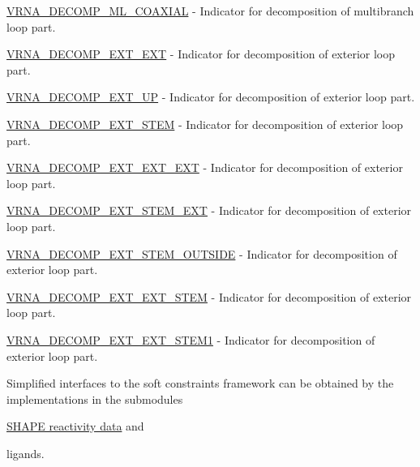 \begin{DoxyItemize}
\item \hyperlink{group__constraints_ga4fe48d575830b16c208e280e01ab1497}{V\+R\+N\+A\+\_\+\+D\+E\+C\+O\+M\+P\+\_\+\+M\+L\+\_\+\+C\+O\+A\+X\+I\+AL} -\/ Indicator for decomposition of multibranch loop part.
\item \hyperlink{group__constraints_ga437adf5115c1999304eff26b41e4c9b6}{V\+R\+N\+A\+\_\+\+D\+E\+C\+O\+M\+P\+\_\+\+E\+X\+T\+\_\+\+E\+XT} -\/ Indicator for decomposition of exterior loop part.
\item \hyperlink{group__constraints_gaff1ddaffe86d984623910b40cc8a8717}{V\+R\+N\+A\+\_\+\+D\+E\+C\+O\+M\+P\+\_\+\+E\+X\+T\+\_\+\+UP} -\/ Indicator for decomposition of exterior loop part.
\item \hyperlink{group__constraints_gae44b5ace0d9b4a29088069ecb4cec441}{V\+R\+N\+A\+\_\+\+D\+E\+C\+O\+M\+P\+\_\+\+E\+X\+T\+\_\+\+S\+T\+EM} -\/ Indicator for decomposition of exterior loop part.
\item \hyperlink{group__constraints_ga803bd818b3f4b2b0a4a5cfa2f7dc2045}{V\+R\+N\+A\+\_\+\+D\+E\+C\+O\+M\+P\+\_\+\+E\+X\+T\+\_\+\+E\+X\+T\+\_\+\+E\+XT} -\/ Indicator for decomposition of exterior loop part.
\item \hyperlink{group__constraints_gabb09c5b78b75a44502fc77b950125c1e}{V\+R\+N\+A\+\_\+\+D\+E\+C\+O\+M\+P\+\_\+\+E\+X\+T\+\_\+\+S\+T\+E\+M\+\_\+\+E\+XT} -\/ Indicator for decomposition of exterior loop part.
\item \hyperlink{group__constraints_gae7554cd3ff089360c02e4920229e221c}{V\+R\+N\+A\+\_\+\+D\+E\+C\+O\+M\+P\+\_\+\+E\+X\+T\+\_\+\+S\+T\+E\+M\+\_\+\+O\+U\+T\+S\+I\+DE} -\/ Indicator for decomposition of exterior loop part.
\item \hyperlink{group__constraints_ga06efd054c9271438f6d82d4559d9e69f}{V\+R\+N\+A\+\_\+\+D\+E\+C\+O\+M\+P\+\_\+\+E\+X\+T\+\_\+\+E\+X\+T\+\_\+\+S\+T\+EM} -\/ Indicator for decomposition of exterior loop part.
\item \hyperlink{group__constraints_ga2e75d7a77118735b32f25422d9686719}{V\+R\+N\+A\+\_\+\+D\+E\+C\+O\+M\+P\+\_\+\+E\+X\+T\+\_\+\+E\+X\+T\+\_\+\+S\+T\+E\+M1} -\/ Indicator for decomposition of exterior loop part.
\end{DoxyItemize}

Simplified interfaces to the soft constraints framework can be obtained by the implementations in the submodules


\begin{DoxyItemize}
\item \hyperlink{group__SHAPE__reactivities}{S\+H\+A\+PE reactivity data} and
\item ligands.
\end{DoxyItemize}

